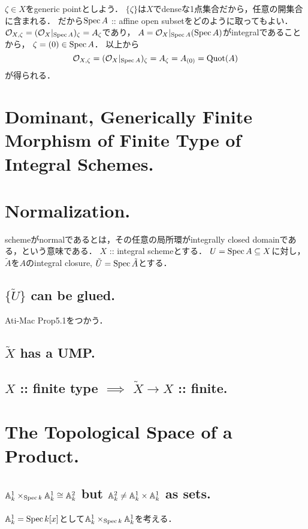 \documentclass[a4paper]{jsarticle}
\newcommand{\shO}{\mathcal{O}}
\begin{document}
    $\zeta \in X$をgeneric pointとしよう．
    $\{\zeta\}$は$X$でdenseな1点集合だから，任意の開集合に含まれる．
    だから$\operatorname{Spec} A$ :: affine open subsetをどのように取ってもよい．
    $\shO_{X,\zeta}=(\shO_X|_{\Spec A})_{\zeta}=A_{\zeta}$であり，
    $A=\shO_X|_{\Spec A}(\Spec A)$がintegralであることから，
    $\zeta=(0) \in \operatorname{Spec} A$．
    以上から
    \[ \shO_{X,\zeta}=(\shO_X|_{\Spec A})_{\zeta}=A_{\zeta}=A_{(0)}=\Quot(A) \]
    が得られる．

\section{Dominant, Generically Finite Morphism of Finite Type of Integral Schemes.} %

\section{Normalization.} %
    schemeがnormalであるとは，その任意の局所環がintegrally closed domainである，という意味である．
    $X$ :: integral schemeとする．
    $U=\operatorname{Spec} A \subseteq X$に対し，$\tilde{A}$を$A$のintegral closure, $\tilde{U}=\operatorname{Spec} \tilde{A}$とする．

    \subsection{$\{ \tilde{U} \}$ can be glued.}
    Ati-Mac Prop5.1をつかう．

    \subsection{$\tilde{X}$ has a UMP.}

    \subsection{$X$ :: finite type $\implies$ $\tilde{X} \to X$ :: finite.}

\section{The Topological Space of a Product.} %
    \subsection{$\mathbb{A}^1_k \times_{\operatorname{Spec} k} \mathbb{A}^1_k \cong \mathbb{A}^2_k$ but $\mathbb{A}^2_k \neq \mathbb{A}^1_k \times \mathbb{A}^1_k$ as sets.}
    $\mathbb{A}_k^1=\operatorname{Spec} k[x]$として$\mathbb{A}^1_k \times_{\operatorname{Spec} k} \mathbb{A}^1_k$を考える．
\end{document}
